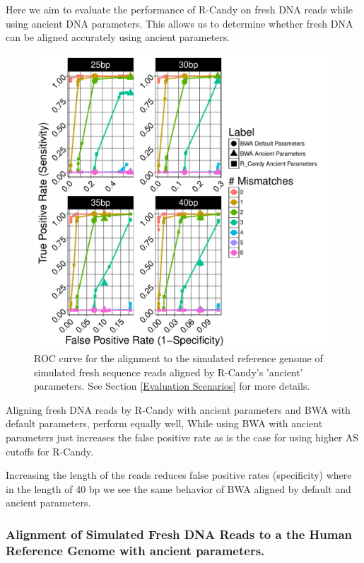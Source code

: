 \documentclass[11pt,a4paper]{report}
\begin{document}
Here we aim to evaluate the performance of R-Candy on fresh DNA reads while 
using ancient DNA parameters. This allows us to determine whether fresh DNA
can be aligned accurately using ancient parameters. 


\begin{figure}[H]
\centering
\includegraphics[width=11cm]{pictures/f_DS8_emp.pdf}
\caption{ ROC curve for the alignment to the simulated reference genome of 
simulated fresh sequence reads aligned by R-Candy's 'ancient' parameters. See Section 
\ref{Evaluation Scenarios} for more details.}
\label{DS8_emp}
\end{figure}


Aligning fresh DNA reads by R-Candy with ancient parameters and BWA with default 
parameters, perform equally well, While using BWA with ancient parameters just 
increases the false positive rate as is the case for using higher AS cutoffs for 
R-Candy.

Increasing the length of the reads reduces false positive rates (specificity)  
where in the length of 40 bp we see the same behavior of BWA aligned by default
and ancient parameters.




\subsubsection{ Alignment of Simulated Fresh DNA Reads to a the Human Reference Genome
with ancient parameters.}
\end{document}
